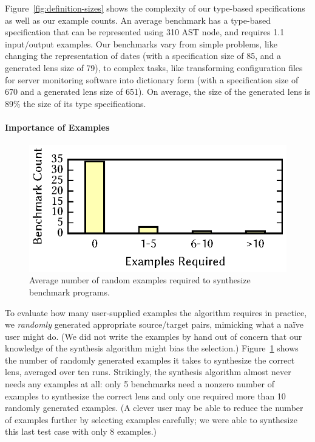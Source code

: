 \documentclass[12pt]{article}
\begin{document}
{Figure~\ref{fig:definition-sizes} shows the complexity of our type-based
specifications as well as our example counts.
An average benchmark has a type-based specification that can be represented using
310 AST node, and requires 1.1 input/output examples.
Our benchmarks vary from simple problems, like changing the
representation of dates
(with a specification size of 85, and a generated lens size of 79), to 
complex tasks, like transforming configuration files for server monitoring
software into dictionary form (with a specification size of 670 and
a generated lens size of 651).  On average, the size of the generated lens is
89\% the size of its type specifications.


\paragraph*{Importance of Examples}

\begin{figure}
  \centering
  \includegraphics{figs/examples.eps}
  \caption{Average number of random examples required to synthesize benchmark
    programs. %
  }
  \label{fig:exs-reqd}
\end{figure}

To evaluate how many user-supplied examples the algorithm requires in
practice, we \textit{randomly} generated appropriate source/target
pairs, mimicking what a na\"{i}ve user might do.  (We did not write the
examples by hand out of concern that our knowledge of the synthesis
algorithm might bias the selection.) Figure~\ref{fig:exs-reqd} shows
the number of randomly generated examples it takes to synthesize the
correct lens, averaged over ten runs.  Strikingly, the synthesis algorithm
almost never needs 
any examples at all: only 5 benchmarks need a nonzero number of examples to
synthesize the correct lens and only one required more than
10 randomly generated examples.
(A clever user may be able to reduce the
number of examples further by selecting examples carefully; we were able to
synthesize this last test case with only 8 examples.)

}
\end{document}
